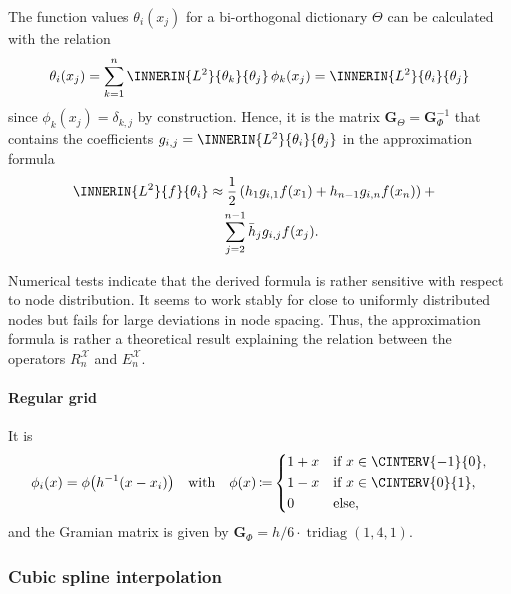 \documentclass[a4paper]{paper}
\newcommand*{\SPC}[1]{{\ensuremath{\mathscr{#1}}}}
\newcommand*{\EXT}[2]{\ensuremath{E_{#1}^{#2}}}
\newcommand*{\REST}[2]{\ensuremath{R_{#1}^{#2}}}
\newcommand*{\RnX}{{\ensuremath{\REST{n}{\SPC{X}}}}}
\newcommand*{\EnX}{{\ensuremath{\EXT{n}{\SPC{X}}}}}
\DeclareMathOperator{\TRIDIAG}{{tridiag}}
\DeclareMathOperator{\DEFEQ}{{\coloneqq}}
\newcommand*{\BDG}{\boldsymbol{G}}
\begin{document}
%
The function values $\theta_i(x_j)$ for a bi-orthogonal dictionary $\Theta$ can be calculated with the 
relation
%
\begin{equation*}
 \theta_i(x_j) 
 = \sum_{k=1}^n \INNERIN{L^2}{\theta_k}{\theta_j}\, \phi_k(x_j)
 = \INNERIN{L^2}{\theta_i}{\theta_j}
\end{equation*}
%
since $\phi_k(x_j) = \delta_{k,j}$ by construction. Hence, it is the matrix $\BDG_\Theta = 
\BDG_\Phi^{-1}$ 
that contains the coefficients $g_{i,j} = \INNERIN{L^2}{\theta_i}{\theta_j}$ in the approximation formula
%
\begin{align*}
 \INNERIN{L^2}{f}{\theta_i}
 & \approx \frac{1}{2}\left(
 h_1 g_{i,1} f(x_1) + h_{n-1} g_{i,n} f(x_n)  
 \right) + \phantom{x} \\
 &\hspace{10pt} \sum_{j=2}^{n-1} \bar h_j g_{i,j} f(x_j).
\end{align*}

\begin{remark}
 Numerical tests indicate that the derived formula is rather sensitive with respect to node distribution. It seems to 
 work stably for close to uniformly distributed nodes but fails for large deviations in node spacing. Thus, the 
 approximation formula is rather a theoretical result explaining the relation between the operators $\RnX$ and $\EnX$.
\end{remark}

\paragraph{Regular grid}

It is
%
\begin{equation*}
 \phi_i(x) = \phi\big( h^{-1}(x-x_i) \big)
 \quad \text{with} \quad
 \phi(x) \DEFEQ
 \begin{dcases}
  1 + x & \text{if } x \in \CINTERV{-1}{0}, \\
  1-x & \text{if } x \in \CINTERV{0}{1}, \\
  0 & \text{else},
 \end{dcases}
\end{equation*}
%
and the Gramian matrix is given by $\BDG_\Phi = h/6\cdot \TRIDIAG(1,4,1)$.
%



\subsubsection{Cubic spline interpolation}
\label{subsubsec:specif:interp:cubic}
\end{document}
